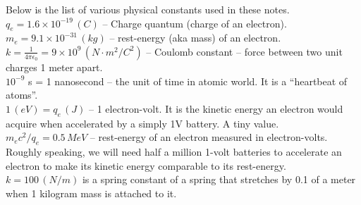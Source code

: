 Below is the list of various physical constants used in these notes.\\
$q_e = 1.6\times 10^{-19}\,(C)$ -- Charge quantum (charge of an
electron).\\
$m_e = 9.1\times 10^{-31}\,(kg)$ -- rest-energy (aka mass) of an electron.\\
$k=\frac{1}{4\pi\epsilon_0} = 9\times 10^9\,(N\cdot m^2/C^2)$ --
Coulomb constant -- force between two unit charges 1 meter apart.\\
$10^{-9}$ s = 1 nanosecond -- the unit of time in atomic world. It is a ``heartbeat
of atoms''.\\
$1\, (eV) = q_e\, (J)$ -- 1 electron-volt. It is the kinetic energy
an electron would acquire when accelerated by a simply 1V battery. A
tiny value.\\
$m_ec^2/q_e= 0.5\, MeV$ -- rest-energy of an electron measured in
electron-volts. Roughly speaking, we will need half a million
1-volt batteries to accelerate an electron to make its kinetic energy
comparable to its rest-energy. \\
$k=100\,(N/m)$ is a spring constant of a spring that stretches by 0.1
of a meter when 1 kilogram mass is attached to it.\\
